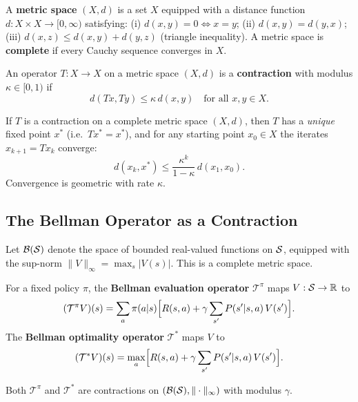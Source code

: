 \begin{definition}
\label{def:metric-space}
A \textbf{metric space} $(X, d)$ is a set $X$ equipped with a distance
function $d: X \times X \to [0,\infty)$ satisfying: (i) $d(x,y)=0
\Leftrightarrow x=y$; (ii) $d(x,y)=d(y,x)$; (iii) $d(x,z) \leq
d(x,y)+d(y,z)$ (triangle inequality).  A metric space is
\textbf{complete} if every Cauchy sequence converges in $X$.
\end{definition}

\begin{definition}
\label{def:contraction}
An operator $T: X \to X$ on a metric space $(X,d)$ is a
\textbf{contraction} with modulus $\kappa \in [0,1)$
if
\[
    d(Tx, Ty) \leq \kappa\, d(x, y) \quad \text{for all } x, y \in X.
\]
\end{definition}

\begin{theorem}
\label{thm:banach}
If $T$ is a contraction on a complete metric space $(X,d)$, then $T$ has
a \emph{unique} fixed point $x^*$ (i.e.\ $Tx^* = x^*$), and for any
starting point $x_0 \in X$ the iterates $x_{k+1} = T x_k$ converge:
\[
    d(x_k, x^*) \leq \frac{\kappa^k}{1-\kappa}\,d(x_1, x_0).
\]
Convergence is geometric with rate $\kappa$.
\end{theorem}

\subsection*{The Bellman Operator as a Contraction}

Let $\mathcal{B}(\mathcal{S})$ denote the space of bounded real-valued functions
on $\mathcal{S}$, equipped with the sup-norm $\|V\|_\infty = \max_s |V(s)|$.
This is a complete metric space.

\begin{definition}
\label{def:bellman-op}
For a fixed policy $\pi$, the \textbf{Bellman evaluation operator}
$\mathcal{T}^\pi$ maps $V : \mathcal{S} \to \mathbb{R}$ to
\[
    (\mathcal{T}^\pi V)(s)
    = \sum_a \pi(a|s)\Bigl[R(s,a) + \gamma \sum_{s'} P(s'|s,a)\,V(s')\Bigr].
\]
The \textbf{Bellman optimality operator} $\mathcal{T}^*$ maps $V$ to
\[
    (\mathcal{T}^* V)(s)
    = \max_a \Bigl[R(s,a) + \gamma \sum_{s'} P(s'|s,a)\,V(s')\Bigr].
\]
\end{definition}

\begin{theorem}
\label{thm:bellman-contraction}
Both $\mathcal{T}^\pi$ and $\mathcal{T}^*$ are contractions on
$(\mathcal{B}(\mathcal{S}), \|\cdot\|_\infty)$ with modulus $\gamma$.
\end{theorem}

